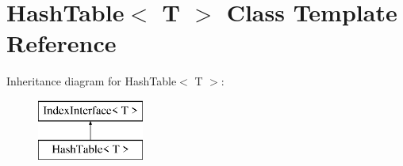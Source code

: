 \hypertarget{classHashTable}{}\section{Hash\+Table$<$ T $>$ Class Template Reference}
\label{classHashTable}
Inheritance diagram for Hash\+Table$<$ T $>$\+:\begin{figure}[H]
\begin{center}
\leavevmode
\includegraphics[height=2.000000cm]{classHashTable}
\end{center}
\end{figure}
